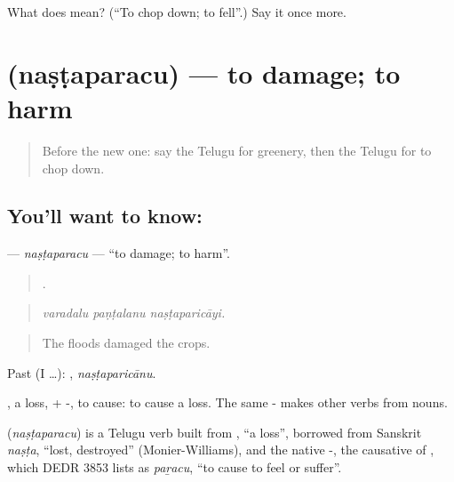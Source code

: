 \begin{tcolorbox}[breakable,colback=teal!4,colframe=teal!35!black,title={Before you move on}]
What does  mean? (\textquotedblleft{}To chop down; to fell\textquotedblright{}.) Say it once more.
\end{tcolorbox}
\section[\texorpdfstring{\te{నష్టపరచు} (naṣṭaparacu)}{నష్టపరచు (naṣṭaparacu)}]{ (naṣṭaparacu) — to damage; to harm}

\label{lesson:TE-C471-nastaparacu}



\begin{quote}
Before the new one: say the Telugu for greenery, then the Telugu for to chop down.
\end{quote}

\subsection*{You'll want to know: }
\textbf{} — \emph{naṣṭaparacu} — \textquotedblleft{}to damage; to harm\textquotedblright{}.

\begin{quote}
  .
\end{quote}

\begin{quote}
\emph{varadalu paṇṭalanu naṣṭaparicāyi.}
\end{quote}

\begin{quote}
The floods damaged the crops.
\end{quote}

Past (I …): , \emph{naṣṭaparicānu}.

, a loss, + -, to cause: to cause a loss. The same - makes other verbs from nouns.

\begin{cousinweb}
\textbf{} (\emph{naṣṭaparacu}) is a Telugu verb built from , \textquotedblleft{}a loss\textquotedblright{}, borrowed from Sanskrit \emph{naṣṭa}, \textquotedblleft{}lost, destroyed\textquotedblright{} (Monier-Williams), and the native -, the causative of , which DEDR 3853 lists as \emph{paṟacu}, \textquotedblleft{}to cause to feel or suffer\textquotedblright{}.
\end{cousinweb}

